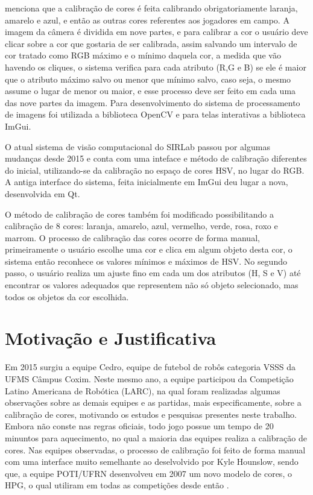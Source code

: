  menciona que a calibração de cores é feita calibrando obrigatoriamente laranja, amarelo e azul, e então as outras cores referentes aos jogadores em campo. A imagem da câmera é dividida em nove partes, e para calibrar a cor o usuário deve clicar sobre a cor que gostaria de ser calibrada, assim salvando um intervalo de cor tratado como RGB máximo e o mínimo daquela cor, a medida
que vão havendo os cliques, o sistema verifica para cada atributo (R,G e B) se ele é maior que o atributo
máximo salvo ou menor que mínimo salvo, caso seja, o mesmo assume o lugar de menor ou
maior, e esse processo deve ser feito em cada uma das nove partes da imagem. 
Para desenvolvimento do sistema de processamento de imagens foi utilizada a biblioteca OpenCV e para telas interativas a biblioteca ImGui.

O atual sistema de visão computacional do SIRLab passou por algumas mudanças desde 2015 e conta com uma inteface e método de calibração diferentes do inicial, utilizando-se da calibração no espaço de cores HSV, no lugar do RGB. A antiga interface do sistema, feita inicialmente em ImGui deu lugar a nova, desenvolvida em Qt\cite{VSSVision}.

O método de calibração de cores também foi modificado possibilitando a calibração de 8 cores: laranja, amarelo, azul, vermelho, verde, rosa, roxo e marrom\cite{VSSVision}. O processo de calibração das cores ocorre de forma manual, primeiramente o usuário escolhe uma cor e clica em algum objeto desta cor, o sistema então reconhece os valores  mínimos e máximos de HSV. No segundo passo, o usuário realiza um ajuste fino em cada um dos atributos (H, S e V) até encontrar os valores adequados que representem não só objeto selecionado, mas todos os objetos da cor escolhida.

\section{Motivação e Justificativa}
Em 2015 surgiu a equipe Cedro, equipe de futebol de robôs categoria VSSS da UFMS Câmpus Coxim. Neste mesmo ano, a equipe participou da Competição Latino Americana de Robótica (LARC), na qual foram realizadas algumas observações sobre as demais equipes e as partidas, mais especificamente, sobre a calibração de cores, motivando os estudos e pesquisas presentes neste trabalho. Embora não conste nas regras oficiais, todo jogo possue um tempo de 20 minuntos para aquecimento, no qual a maioria das equipes realiza a calibração de cores. Nas equipes observadas, o processo de calibração foi feito de forma manual com uma interface muito semelhante ao deselvolvido por Kyle Hounslow\cite{YouTube}, sendo que, a equipe POTI/UFRN desenvolveu em 2007 um novo modelo de cores, o HPG, o qual utiliram em todas as competições desde então  \cite{Martins:2007,Mendes:2008}.

